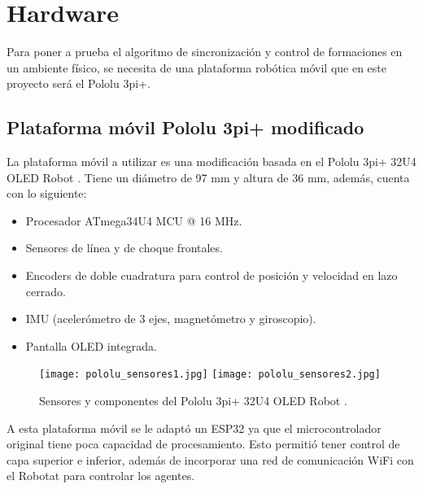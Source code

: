 \section{Hardware}
Para poner a prueba el algoritmo de sincronización y control de formaciones en un ambiente físico, se necesita de una plataforma robótica móvil que en este proyecto será el Pololu 3pi+. 

\subsection{Plataforma móvil Pololu 3pi+ modificado}
La plataforma móvil a utilizar es una modificación basada en el Pololu 3pi+ 32U4 OLED Robot \cite{pololu3pi+}. Tiene un diámetro de 97 mm y altura de 36 mm, además, cuenta con lo siguiente:
\begin{itemize}
	\item Procesador ATmega34U4 MCU @ 16 MHz.
	\item Sensores de línea y de choque frontales.
	\item Encoders de doble cuadratura para control de posición y velocidad en lazo cerrado.
	\item IMU (acelerómetro de 3 ejes, magnetómetro y giroscopio).
	\item Pantalla OLED integrada.
\end{itemize}

\begin{figure}[H]
	\centering
	\texttt{[image: pololu\_sensores1.jpg]} \texttt{[image: pololu\_sensores2.jpg]}
	\caption{Sensores y componentes del Pololu 3pi+ 32U4 OLED Robot \cite{pololu3pi+}.}
	\label{fig:pololu_sensores}
\end{figure}

A esta plataforma móvil se le adaptó un ESP32 ya que el microcontrolador original tiene poca capacidad de procesamiento. Esto permitió tener control de capa superior e inferior, además de incorporar una red de comunicación WiFi con el Robotat para controlar los agentes.









